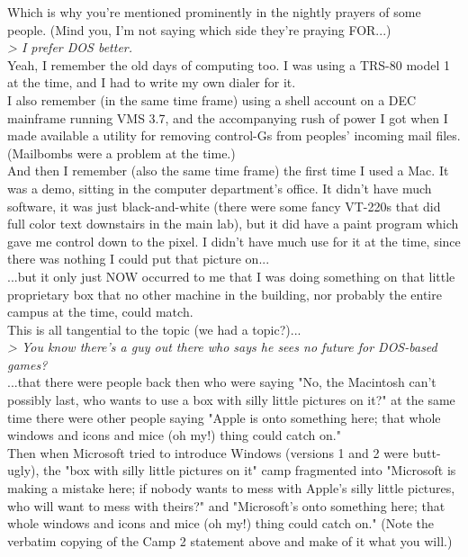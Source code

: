 \documentclass[11pt,twoside,a4paper]{article}
\begin{document}
\begin{multicols*}{2}
Which is why you're mentioned prominently in the nightly prayers of some people. (Mind you, I'm not saying which side they're praying FOR...)~\\

\emph{> I prefer DOS better.}~\\

Yeah, I remember the old days of computing too. I was using a TRS-80 model 1 at the time, and I had to write my own dialer for it.~\\

I also remember (in the same time frame) using a shell account on a DEC mainframe running VMS 3.7, and the accompanying rush of power I got when I made available a utility for removing control-Gs from peoples' incoming mail files. (Mailbombs were a problem at the time.)~\\

And then I remember (also the same time frame) the first time I used a Mac. It was a demo, sitting in the computer department's office. It didn't have much software, it was just black-and-white (there were some fancy VT-220s that did full color text downstairs in the main lab), but it did have a paint program which gave me control down to the pixel. I didn't have much use for it at the time, since there was nothing I could put that picture on...~\\

...but it only just NOW occurred to me that I was doing something on that little proprietary box that no other machine in the building, nor probably the entire campus at the time, could match.~\\

This is all tangential to the topic (we had a topic?)...~\\

\emph{> You know there's a guy out there who says he sees no future for DOS-based games?}~\\

...that there were people back then who were saying "No, the Macintosh can't possibly last, who wants to use a box with silly little pictures on it?" at the same time there were other people saying "Apple is onto something here; that whole windows and icons and mice (oh my!) thing could catch on."~\\

Then when Microsoft tried to introduce Windows (versions 1 and 2 were butt-ugly), the "box with silly little pictures on it" camp fragmented into "Microsoft is making a mistake here; if nobody wants to mess with Apple's silly little pictures, who will want to mess with theirs?" and "Microsoft's onto something here; that whole windows and icons and mice (oh my!) thing could catch on." (Note the verbatim copying of the Camp 2 statement above and make of it what you will.)~\\


\end{multicols*}
\end{document}
